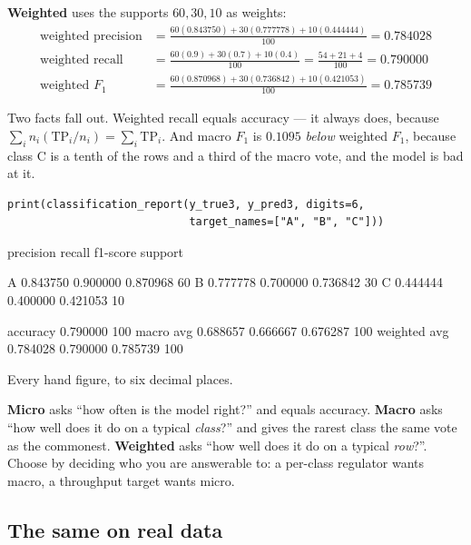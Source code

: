 \documentclass[11pt]{article}
\newcommand{\TP}{\mathrm{TP}}
\begin{document}
\begin{worked}
\textbf{Weighted} uses the supports $60, 30, 10$ as weights:
\begin{align*}
\text{weighted precision} &= \tfrac{60(0.843750) + 30(0.777778) + 10(0.444444)}{100} = 0.784028\\
\text{weighted recall}    &= \tfrac{60(0.9) + 30(0.7) + 10(0.4)}{100} = \tfrac{54 + 21 + 4}{100} = 0.790000\\
\text{weighted } F_1      &= \tfrac{60(0.870968) + 30(0.736842) + 10(0.421053)}{100} = 0.785739
\end{align*}

Two facts fall out. Weighted recall equals accuracy --- it always does, because
$\sum_i n_i (\TP_i / n_i) = \sum_i \TP_i$. And macro $F_1$ is $0.1095$
\emph{below} weighted $F_1$, because class C is a tenth of the rows and a third
of the macro vote, and the model is bad at it.
\end{worked}

\begin{lstlisting}
print(classification_report(y_true3, y_pred3, digits=6,
                            target_names=["A", "B", "C"]))
\end{lstlisting}
\begin{codeout}
              precision    recall  f1-score   support

           A   0.843750  0.900000  0.870968        60
           B   0.777778  0.700000  0.736842        30
           C   0.444444  0.400000  0.421053        10

    accuracy                       0.790000       100
   macro avg   0.688657  0.666667  0.676287       100
weighted avg   0.784028  0.790000  0.785739       100
\end{codeout}

Every hand figure, to six decimal places.

\begin{keyidea}
\textbf{Micro} asks ``how often is the model right?'' and equals accuracy.
\textbf{Macro} asks ``how well does it do on a typical \emph{class}?'' and gives
the rarest class the same vote as the commonest. \textbf{Weighted} asks ``how
well does it do on a typical \emph{row}?''. Choose by deciding who you are
answerable to: a per-class regulator wants macro, a throughput target wants
micro.
\end{keyidea}

\subsection{The same on real data}
\end{document}
